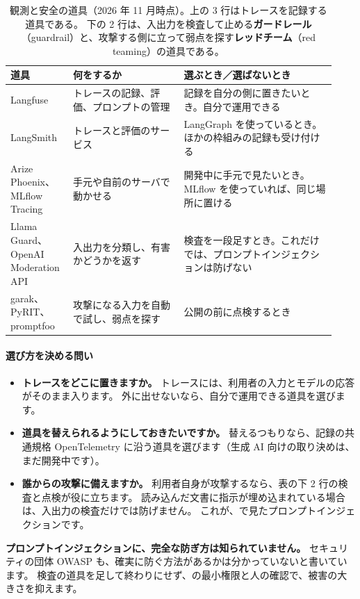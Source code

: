 \begin{table}[htbp]
\centering\footnotesize
\caption{観測と安全の道具（2026 年 11 月時点）。上の 3 行はトレースを記録する道具である。
下の 2 行は、入出力を検査して止める\textbf{ガードレール}（guardrail）と、攻撃する側に立って弱点を探す\textbf{レッドチーム}（red teaming）の道具である。}
\label{tab:tm-observe}
\begin{tabular}{@{}>{\raggedright\arraybackslash}p{0.17\linewidth}>{\raggedright\arraybackslash}p{0.32\linewidth}>{\raggedright\arraybackslash}p{0.44\linewidth}@{}}
\toprule
道具 & 何をするか & 選ぶとき／選ばないとき \\
\midrule
Langfuse & トレースの記録、評価、プロンプトの管理 & 記録を自分の側に置きたいとき。自分で運用できる \\
\addlinespace[2pt]
LangSmith & トレースと評価のサービス & LangGraph を使っているとき。ほかの枠組みの記録も受け付ける \\
\addlinespace[2pt]
Arize Phoenix、MLflow Tracing & 手元や自前のサーバで動かせる & 開発中に手元で見たいとき。MLflow を使っていれば、同じ場所に置ける \\
\midrule
Llama Guard、OpenAI Moderation API & 入出力を分類し、有害かどうかを返す & 検査を一段足すとき。これだけでは、プロンプトインジェクションは防げない \\
\addlinespace[2pt]
garak、PyRIT、promptfoo & 攻撃になる入力を自動で試し、弱点を探す & 公開の前に点検するとき \\
\bottomrule
\end{tabular}
\end{table}

\paragraph{選び方を決める問い}
\begin{itemize}[nosep,beginpenalty=10000]
\item \textbf{トレースをどこに置きますか。}
  トレースには、利用者の入力とモデルの応答がそのまま入ります。
  外に出せないなら、自分で運用できる道具を選びます。
\item \textbf{道具を替えられるようにしておきたいですか。}
  替えるつもりなら、記録の共通規格 OpenTelemetry に沿う道具を選びます（生成 AI 向けの取り決めは、まだ開発中です）。
\item \textbf{誰からの攻撃に備えますか。}
  利用者自身が攻撃するなら、表の下 2 行の検査と点検が役に立ちます。
  読み込んだ文書に指示が埋め込まれている場合は、入出力の検査だけでは防げません。
  これが、で見たプロンプトインジェクションです。
\end{itemize}
\textbf{プロンプトインジェクションに、完全な防ぎ方は知られていません。}
セキュリティの団体 OWASP も、確実に防ぐ方法があるかは分かっていないと書いています。
検査の道具を足して終わりにせず、の最小権限と人の確認で、被害の大きさを抑えます。

